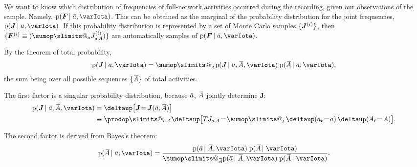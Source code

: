 \documentclass[\ifafour a4paper,12pt,\else a5paper,10pt,\fi%
onecolumn,oneside,article,%
british%
]{memoir}
\makeatletter
\theoremstyle{remark}
\theoremstyle{innote}
\def\sum{\DOTSI\sumop\slimits@}
\def\prod{\DOTSI\prodop\slimits@}
\newcommand*{\delt}{\deltaup}%
\DeclarePairedDelimiter\set{\{}{\}}
\newcommand*{\pf}{\mathrm{p}}%
\renewcommand*{\|}[1][]{\nonscript\,#1\vert\nonscript\;\mathopen{}}
\newcommand*{\tsum}{\mathop{\textstyle\sum}\nolimits}
\newcommand*{\widebar}[1]{{\mkern1.5mu\skew{2}\overline{\mkern-1.5mu#1\mkern-1.5mu}\mkern 1.5mu}}
\newcommand*{\yFF}{F}
\newcommand*{\yF}{\bm{\yFF}}
\newcommand*{\yAs}{\widebar{A}}%
\newcommand*{\yas}{\widebar{a}}%
\newcommand*{\yeq}{\mathrel{\!=\!}}
\newcommand*{\yJJ}{J}
\newcommand*{\yJ}{\bm{\yJJ}}
\newcommand*{\yI}{\varIota}
\makeatother
\begin{document}
We want to know which distribution of frequencies of full-network
activities occurred during the recording, given our observations of the
sample. Namely, $\pf(\yF \| \yas,\yI)$. This can be obtained as the
marginal of the probability distribution for the joint frequencies,
$\pf(\yJ \| \yas, \yI)$. If this probability distribution is represented by
a set of Monte Carlo samples $\set{\yJ^{(i)}}$, then
$\set{\yF^{(i)}\equiv (\sum_{a}J^{(i)}_{a\,A})}$ are automatically samples
of $\pf(\yF \| \yas,\yI)$.

By the theorem of total probability,
\begin{equation}
  \label{eq:total_prob_As}
  \pf(\yJ \| \yas, \yI) =
  \sum_{\yAs}  \pf(\yJ \| \yas, \yAs, \yI)\; \pf(\yAs \| \yas, \yI),
\end{equation}
the sum being over all possible sequences $\set{\yAs}$ of total activities.

The first factor is a singular probability distribution, because $\yas$,
$\yAs$ jointly determine $\yJ$:
\begin{equation}
  \label{eq:singular_J}
  \begin{split}
  \pf(\yJ \| \yas, \yAs, \yI) 
&= \delt\bigl[\yJ \yeq \yJ(\yas,\yAs)\bigr]\\
&\equiv \prod_{a\,A}  \delt\bigl[T J_{a\,A} \yeq  \tsum_{t}
  \delt(a_{t} \yeq  a)\, \delt(A_{t} \yeq  A)\bigr].
\end{split}
\end{equation}

The second factor is derived from Bayes's theorem:
\begin{equation}
  \label{eq:bayes_sequences}
  \pf(\yAs \| \yas, \yI) =
  \frac{\pf(\yas \| \yAs, \yI)\;\pf(\yAs \| \yI)}
  {\sum_{\yAs}\pf(\yas \| \yAs, \yI)\;\pf(\yAs \| \yI)}.
\end{equation}

\bigskip
\end{document}
